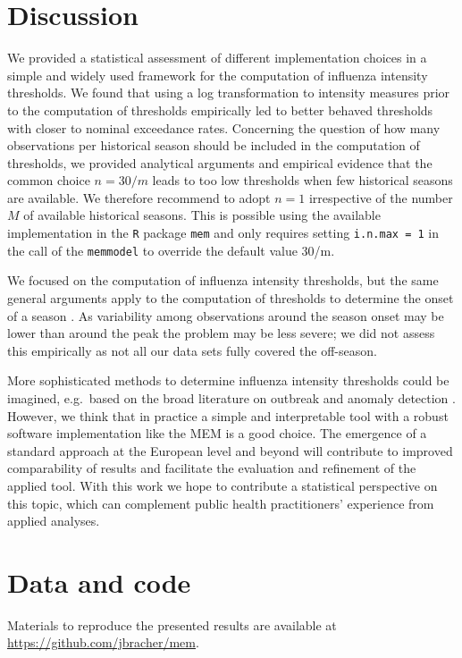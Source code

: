 \documentclass{article}
\begin{document}
\section{Discussion}
\label{sec:discussion}

We provided a statistical assessment of different implementation choices in a simple and widely used framework for the computation of influenza intensity thresholds. We found that using a log transformation to intensity measures prior to the computation of thresholds empirically led to better behaved thresholds with closer to nominal exceedance rates. Concerning the question of how many observations per historical season should be included in the computation of thresholds, we provided analytical arguments and empirical evidence that the common choice $n = 30/m$ leads to too low thresholds when few historical seasons are available. We therefore recommend to adopt $n = 1$ irrespective of the number $M$ of available historical seasons. This is possible using the available implementation in the \texttt{R} package \texttt{mem} and only requires setting \texttt{i.n.max = 1} in the call of the \texttt{memmodel} to override the default value 30/m.

We focused on the computation of influenza intensity thresholds, but the same general arguments apply to the computation of thresholds to determine the onset of a season \citep{Vega2012}. As variability among observations around the season onset may be lower than around the peak the problem may be less severe; we did not assess this empirically as not all our data sets fully covered the off-season.

More sophisticated methods to determine influenza intensity thresholds could be imagined, e.g.\ based on the broad literature on outbreak and anomaly detection \citep{Unkel2012}. However, we think that in practice a simple and interpretable tool with a robust software implementation like the MEM is a good choice. The emergence of a standard approach at the European level and beyond will contribute to improved comparability of results and facilitate the evaluation and refinement of the applied tool. With this work we hope to contribute a statistical perspective on this topic, which can complement public health practitioners' experience from applied analyses.


\section*{Data and code}

Materials to reproduce the presented results are available at \url{https://github.com/jbracher/mem}.




\end{document}
